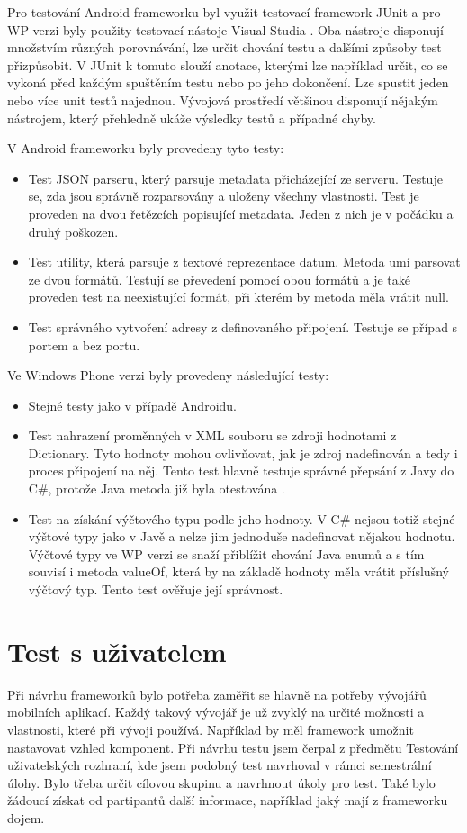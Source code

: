 Pro testování Android frameworku byl využit testovací framework JUnit \cite{junit} a pro WP verzi byly použity testovací nástoje Visual Studia \cite{vs-unit}. Oba nástroje disponují množstvím různých porovnávání, lze určit chování testu a dalšími způsoby test přizpůsobit. V JUnit k tomuto slouží anotace, kterými lze například určit, co se vykoná před každým spuštěním testu nebo po jeho dokončení. Lze spustit jeden nebo více unit testů najednou. Vývojová prostředí většinou disponují nějakým nástrojem, který přehledně ukáže výsledky testů a případné chyby. 

V Android frameworku byly provedeny tyto testy:
\begin{itemize}
\item Test JSON parseru, který parsuje metadata přicházející ze serveru. Testuje se, zda jsou správně rozparsovány a uloženy všechny vlastnosti. Test je proveden na dvou řetězcích popisující metadata. Jeden z nich je v počádku a druhý poškozen.
\item Test utility, která parsuje z textové reprezentace datum. Metoda umí parsovat ze dvou formátů. Testují se převedení pomocí obou formátů a je také proveden test na neexistující formát, při kterém by metoda měla vrátit null.
\item Test správného vytvoření adresy z definovaného připojení. Testuje se případ s portem a bez portu.
\end{itemize} 
Ve Windows Phone verzi byly provedeny následující testy:
\begin{itemize}
\item Stejné testy jako v případě Androidu.
\item Test nahrazení proměnných v XML souboru se zdroji hodnotami z Dictionary. Tyto hodnoty mohou ovlivňovat, jak je zdroj nadefinován a tedy i proces připojení na něj. Tento test hlavně testuje správné přepsání z Javy do C\#, protože Java metoda již byla otestována \cite{tomasek-thesis}.
\item Test na získání výčtového typu podle jeho hodnoty. V C\# nejsou totiž stejné výštové typy jako v Javě a nelze jim jednoduše nadefinovat nějakou hodnotu. Výčtové typy ve WP verzi se snaží přiblížit chování Java enumů a s tím souvisí i metoda valueOf, která by na základě hodnoty měla vrátit příslušný výčtový typ. Tento test ověřuje její správnost.
\end{itemize} 

\section{Test s uživatelem}
Při návrhu frameworků bylo potřeba zaměřit se hlavně na potřeby vývojářů mobilních aplikací. Každý takový vývojář je už zvyklý na určité možnosti a vlastnosti, které při vývoji používá. Například by měl framework umožnit nastavovat vzhled komponent. Při návrhu testu jsem čerpal z předmětu Testování uživatelských rozhraní, kde jsem podobný test navrhoval v rámci semestrální úlohy. Bylo třeba určit cílovou skupinu a navrhnout úkoly pro test. Také bylo žádoucí získat od partipantů další informace, například jaký mají z frameworku dojem.

